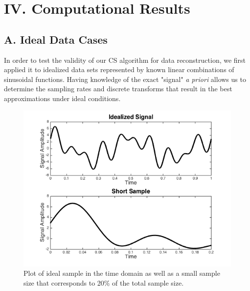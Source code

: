 \documentclass[11pt]{article}
\begin{document}

\section*{IV.	Computational Results} %


\subsection*{A.	Ideal Data Cases}
In order to test the validity of our CS algorithm for data reconstruction, we first applied it to idealized data sets represented by known linear combinations of sinusoidal functions. Having knowledge of the exact "signal" \emph{a priori} allows us to determine the sampling rates and discrete transforms that result in the best approximations under ideal conditions. 

\begin{figure}[H]
\includegraphics[scale = 0.8]{idealsig_shortsample.png}
\caption{Plot of ideal sample in the time domain as well as a small sample size that corresponds to 20\% of the total sample size.}
\label{fig:idealsig}
\end{figure}
\end{document}
